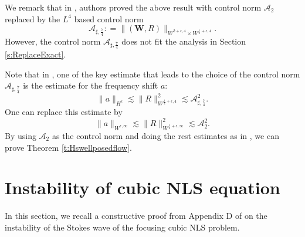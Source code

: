 \documentclass[12pt]{amsart}
\theoremstyle{remark}
\theoremstyle{definition}
\numberwithin{equation}{section}
\newcommand{\f}{\frac}
\newcommand{\bw}{\mathbf{W}}
\newcommand{\ASSharp}{{\mathcal{A}_{\sharp,\frac{7}{4}}^2}}
\begin{document}
We remark that in \cite{WanY}, authors proved the above result with control norm $\mathcal{A}_2$ replaced by the $L^4$ based control norm
\begin{equation*}
 \mathcal{A}_{\sharp,\f74} : = \|(\bw, R) \|_{W^{2+\epsilon,4}\times W^{\f12+\epsilon,4}}.
\end{equation*}
However, the control norm $\mathcal{A}_{\sharp,\f74}$ does not fit the analysis in Section \ref{s:ReplaceExact}.

Note that in \cite{WanY}, one of the key estimate that leads to the choice of the control norm $\mathcal{A}_{\sharp,\f74}$ is the estimate for the frequency shift $a$:
\begin{equation*} 
 \|a\|_{H^\epsilon} \lesssim \|R \|^2_{W^{\frac{1}{2}+\epsilon, 4}} \lesssim \ASSharp.  
\end{equation*}
One can replace this estimate by 
\begin{equation*}
\|a\|_{W^{\epsilon, \infty}} \lesssim \|R \|^2_{W^{\frac{1}{2}+\epsilon, \infty}} \lesssim \mathcal{A}_2^2.
\end{equation*}
By using $\mathcal{A}_2$ as the control norm and doing the rest estimates as in \cite{WanY}, we can prove Theorem \ref{t:Hswellposedflow}.

\section{Instability of cubic NLS equation} \label{s:NLSInstability}

In this section, we recall a constructive proof from Appendix D of \cite{MR4627323} on the instability of the Stokes wave of the focusing cubic NLS problem.
\end{document}
